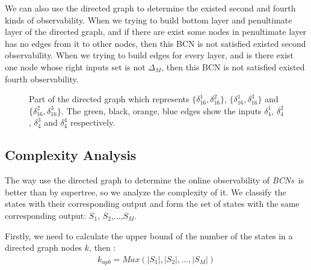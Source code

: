 \documentclass[conference]{IEEEtran} %
\def \BCNs {{\em BCNs}}
\begin{document}
We can also use the directed graph to determine the existed second and fourth kinds of observability. When we trying to build bottom layer and penultimate layer of the directed graph, and if there are exist some nodes in penultimate layer has no edges from it to other nodes, then this BCN is not satisfied existed second observability. When we trying to build edges for every layer, and is there exist one node whose right inputs set is not $\Delta_M$, then this BCN is not satisfied existed fourth observability.
\begin{figure}[thpb]
      \centering
      
      \caption{Part of the directed graph which represents $\{\delta_{16}^1,\delta_{16}^2\}$, $\{\delta_{16}^1,\delta_{16}^3\}$ and $\{\delta_{16}^2,\delta_{16}^3\}$. The green, black, orange, blue edges show the inputs $\delta_4^1$, $\delta_4^2$, $\delta_4^3$ and $\delta_4^4$ respectively.}
      \label{fig:4}
   \end{figure}
\subsection{Complexity Analysis}
The way use the directed graph to determine the online observability of \BCNs\ is better than by supertree, so we analyze the complexity of it. We classify the states with their corresponding output and form the set of states with the same corresponding output: $S_1$, $S_2$,...,$S_M$.

Firstly, we need to calculate the upper bound of the number of the states in a directed graph nodes $k$, then :
\begin{equation}
\begin{split}
k_{upb}= Max(|S_1|,|S_2|,...,|S_M|)
\end{split}
\end{equation}
\end{document}
